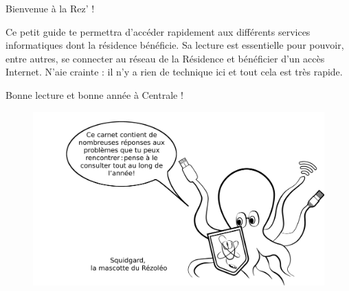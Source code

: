 \documentclass[12pt]{article}
\begin{document}
  \vspace*{0.5cm}
  Bienvenue à la Rez’ !
  \newline

  Ce petit guide te permettra d’accéder rapidement aux différents services informatiques dont la résidence bénéficie. Sa lecture est essentielle pour pouvoir, entre autres, se connecter au réseau de la Résidence et bénéficier d’un accès Internet.
  N’aie crainte : il n’y a rien de technique ici et tout cela est très rapide.
  \newline

  Bonne lecture et bonne année à Centrale !  \newline
  \vspace*{3cm}
  \begin{figure}[h!]
    \centerline{\includegraphics[scale=0.13]{imageAccueil.png}}
  \end{figure}

  \newpage
\end{document}
